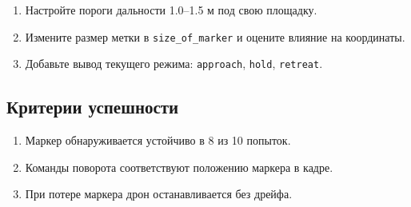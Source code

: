 \begin{taskbox}
\begin{enumerate}
\item Настройте пороги дальности 1.0--1.5 м под свою площадку.
\item Измените размер метки в \texttt{size\_of\_marker} и оцените влияние на координаты.
\item Добавьте вывод текущего режима: \texttt{approach}, \texttt{hold}, \texttt{retreat}.
\end{enumerate}
\end{taskbox}

\subsection{Критерии успешности}
\begin{enumerate}
\item Маркер обнаруживается устойчиво в 8 из 10 попыток.
\item Команды поворота соответствуют положению маркера в кадре.
\item При потере маркера дрон останавливается без дрейфа.
\end{enumerate}
